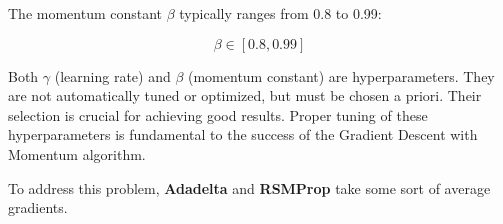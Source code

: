 The momentum constant $\beta$ typically ranges from 0.8 to 0.99:

\begin{equation}
    \beta \in [0.8, 0.99]
\end{equation}

Both $\gamma$ (learning rate) and $\beta$ (momentum constant) are hyperparameters. They are not automatically tuned or optimized, but must be chosen a priori. Their selection is crucial for achieving good results. Proper tuning of these hyperparameters is fundamental to the success of the Gradient Descent with Momentum algorithm.

To address this problem, \textbf{Adadelta} and \textbf{RSMProp} take some sort of average gradients.


